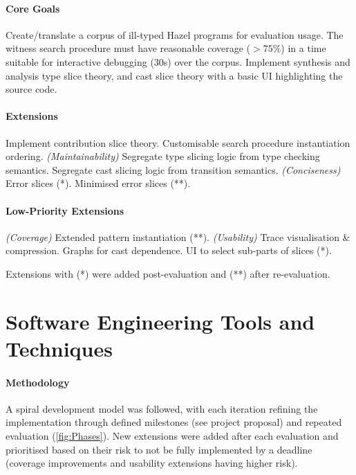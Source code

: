 \paragraph{{\color{red} Core Goals}} Create/translate a corpus of ill-typed Hazel programs for evaluation usage. The witness search procedure must have reasonable coverage ($>75\%$) in a time suitable for interactive debugging (30s) over the corpus. Implement synthesis and analysis type slice theory, and cast slice theory with a basic UI highlighting the source code.

\paragraph{{\color{orange} Extensions}} Implement contribution slice theory. Customisable search procedure instantiation ordering. \textit{(Maintainability)} Segregate type slicing logic from type checking semantics. Segregate cast slicing logic from transition semantics. \textit{(Conciseness)} Error slices (*). Minimised error slices (**). 

\paragraph{{\color{blue} Low-Priority Extensions}} \textit{(Coverage)} Extended pattern instantiation (**). \textit{(Usability)} Trace visualisation \& compression. Graphs for cast dependence. UI to select sub-parts of slices (*). 


Extensions with (*) were added post-evaluation and (**) after re-evaluation.
\section{Software Engineering Tools and Techniques}\label{sec:EngineeringMethodology}
\paragraph{Methodology} A spiral development model was followed, with each iteration refining the implementation through defined milestones (see project proposal) and repeated evaluation (\cref{fig:Phases}). New extensions were added after each evaluation and prioritised based on their risk to not be fully implemented by a deadline (coverage improvements and usability extensions having higher risk).

